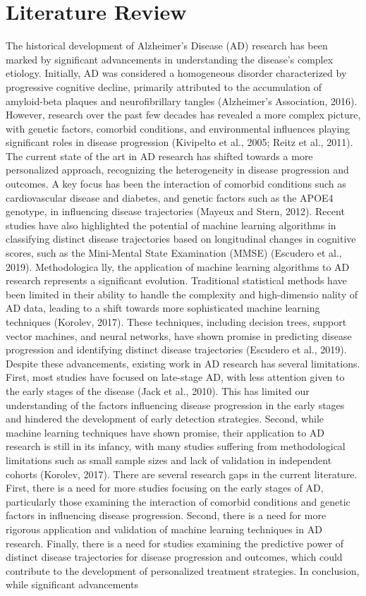 \documentclass[conference]{IEEEtran}
\begin{document}
\section{Literature Review}
The historical development of Alzheimer's Disease (AD) research has been marked by significant advancements in understanding the disease's complex etiology. Initially, AD was considered a homogeneous disorder characterized by progressive cognitive decline, primarily attributed to the accumulation of amyloid-beta plaques and neurofibrillary tangles (Alzheimer's Association, 2016). However, research over the past few decades has revealed a more complex picture, with genetic factors, comorbid conditions, and environmental influences playing significant roles in disease progression (Kivipelto et al., 2005; Reitz et al., 2011). The current state of the art in AD research has shifted towards a more personalized approach, recognizing the heterogeneity in disease progression and outcomes. A key focus has been the interaction of comorbid conditions such as cardiovascular disease and diabetes, and genetic factors such as the APOE4 genotype, in influencing disease trajectories (Mayeux and Stern, 2012). Recent studies have also highlighted the potential of machine learning algorithms in classifying distinct disease trajectories based on longitudinal changes in cognitive scores, such as the Mini-Mental State Examination (MMSE) (Escudero et al., 2019). Methodologica lly, the application of machine learning algorithms to AD research represents a significant evolution. Traditional statistical methods have been limited in their ability to handle the complexity and high-dimensio nality of AD data, leading to a shift towards more sophisticated machine learning techniques (Korolev, 2017). These techniques, including decision trees, support vector machines, and neural networks, have shown promise in predicting disease progression and identifying distinct disease trajectories (Escudero et al., 2019). Despite these advancements, existing work in AD research has several limitations. First, most studies have focused on late-stage AD, with less attention given to the early stages of the disease (Jack et al., 2010). This has limited our understanding of the factors influencing disease progression in the early stages and hindered the development of early detection strategies. Second, while machine learning techniques have shown promise, their application to AD research is still in its infancy, with many studies suffering from methodological limitations such as small sample sizes and lack of validation in independent cohorts (Korolev, 2017). There are several research gaps in the current literature. First, there is a need for more studies focusing on the early stages of AD, particularly those examining the interaction of comorbid conditions and genetic factors in influencing disease progression. Second, there is a need for more rigorous application and validation of machine learning techniques in AD research. Finally, there is a need for studies examining the predictive power of distinct disease trajectories for disease progression and outcomes, which could contribute to the development of personalized treatment strategies. In conclusion, while significant advancements 
\end{document}
